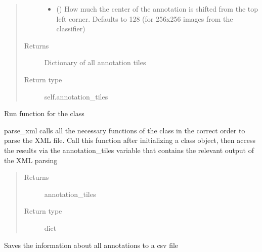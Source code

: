 \documentclass[letterpaper,10pt,english]{sphinxmanual}
\begin{document}
\begin{fulllineitems}
\begin{fulllineitems}
\begin{quote}
\begin{description}
\begin{itemize}
\item {} 
 () \textendash{} How much the center of the annotation is shifted from the top left corner. Defaults
to 128 (for 256x256 images from the classifier)

\end{itemize}

\item[{Returns}] \leavevmode
Dictionary of all annotation tiles

\item[{Return type}] \leavevmode
self.annotation\_tiles

\end{description}\end{quote}

\end{fulllineitems}


\begin{fulllineitems}
\label{\detokenize{index:sites_of_interest_parser.MapsXmlParser.parse_xml}}
Run function for the class

parse\_xml calls all the necessary functions of the class in the correct order to parse the XML file. Call this
function after initializing a class object, then access the results via the annotation\_tiles variable that
contains the relevant output of the XML parsing
\begin{quote}\begin{description}
\item[{Returns}] \leavevmode
annotation\_tiles

\item[{Return type}] \leavevmode
dict

\end{description}\end{quote}

\end{fulllineitems}


\begin{fulllineitems}
\label{\detokenize{index:sites_of_interest_parser.MapsXmlParser.save_annotation_tiles_to_csv}}
Saves the information about all annotations to a csv file


\end{fulllineitems}
\end{fulllineitems}
\end{document}
